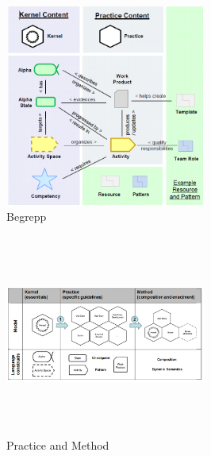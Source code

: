 \begin{figure}[htbp]
    \centerline{\includegraphics[max height=250px, max width=250px]{Z. images/begrepp.png}}
    \caption{Begrepp}
    \label{fig}
\end{figure}

\begin{figure}[htbp]
    \centerline{\includegraphics[max height=250px, max width=250px]{Z. images/practicemethod.png}}
    \caption{Practice and Method}
    \label{fig}
\end{figure}
